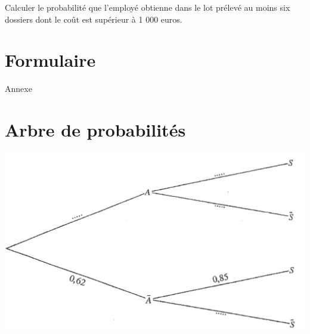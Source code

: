 \documentclass[a4paper,12pt]{scrartcl}
\begin{document}
\question{}Calculer le probabilité que l'employé obtienne dans le lot prélevé au moins six dossiers dont le coût est supérieur à 1 000 euros. 





\section*{Formulaire}



 

\cleardoublepage

\begin{center}
 \Huge{Annexe}
\end{center}



\section*{Arbre de probabilités}

\includegraphics[width=\linewidth]{Arbuste.png}
\end{document}
